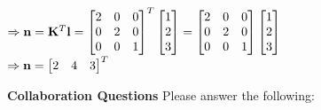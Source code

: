 \documentclass[11pt,addpoints,answers]{exam}
\numberwithin{equation}{section} %
\numberwithin{figure}{section} %
\numberwithin{table}{section} %
\begin{document}
\begin{questions}
\begin{tcolorbox}[fit,height=5cm, width=\textwidth, blank, borderline={0.5pt}{-2pt},halign=left, valign=center, nobeforeafter]
$\Rightarrow \mathbf{n} = \mathbf{K}^T \mathbf{l} = \begin{bmatrix} 2&0&0\\0&2&0\\0&0&1 \end{bmatrix}^T \begin{bmatrix} 1\\2\\3 \end{bmatrix} =  \begin{bmatrix} 2&0&0\\0&2&0\\0&0&1 \end{bmatrix} \begin{bmatrix} 1\\2\\3 \end{bmatrix}$\\

\textcolor{red}{$\Rightarrow \mathbf{n} = \begin{bmatrix} 2&4&3 \end{bmatrix}^T$}

\end{tcolorbox}

\end{questions}

\clearpage

\textbf{Collaboration Questions} Please answer the following:
\end{document}
